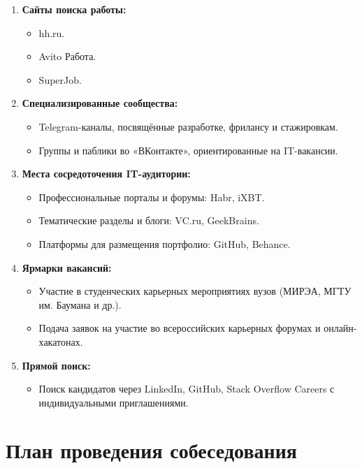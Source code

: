 \documentclass[14pt, russian]{matmex-diploma-custom}
\begin{document}
\begin{enumerate}
    \item \textbf{Сайты поиска работы:}
    \begin{itemize}
        \item hh.ru.
        \item Avito Работа.
        \item SuperJob.
    \end{itemize}

    \item \textbf{Специализированные сообщества:}
    \begin{itemize}
        \item Telegram-каналы, посвящённые разработке, фрилансу и стажировкам.
        \item Группы и паблики во «ВКонтакте», ориентированные на IT-вакансии.
    \end{itemize}

    \item \textbf{Места сосредоточения IT-аудитории:}
    \begin{itemize}
        \item Профессиональные порталы и форумы: Habr, iXBT.
        \item Тематические разделы и блоги: VC.ru, GeekBrains.
        \item Платформы для размещения портфолио: GitHub, Behance.
    \end{itemize}

    \item \textbf{Ярмарки вакансий:}
    \begin{itemize}
        \item Участие в студенческих карьерных мероприятиях вузов (МИРЭА, МГТУ им. Баумана и др.).
        \item Подача заявок на участие во всероссийских карьерных форумах и онлайн-хакатонах.
    \end{itemize}

    \item \textbf{Прямой поиск:}
    \begin{itemize}
        \item Поиск кандидатов через LinkedIn, GitHub, Stack Overflow Careers с индивидуальными приглашениями.
    \end{itemize}
\end{enumerate}

\section{План проведения собеседования}
\end{document}
